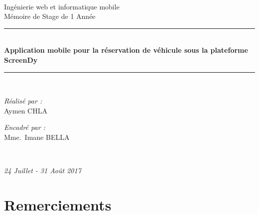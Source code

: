 \documentclass[12pt,a4paper]{report}
\makeatletter
\newcommand\mainmatter{%
	\cleardoublepage
	\pagenumbering{arabic}}
\makeatother
\begin{document}
\begin{titlepage}
\begin{center}
\begin{minipage}{0.4\textwidth}
		\end{minipage}\\[3cm]



		{\normalsize Ingénierie web et informatique mobile }\\[0.5cm]

		{\normalsize M\'emoire de Stage de  1 Ann\'ee}\\[0.5cm]

		\rule{\linewidth}{0.5mm} \\[0.4cm]
		{ \large \bfseries Application mobile pour la réservation de véhicule sous la plateforme ScreenDy \\[0.4cm] }
		\rule{\linewidth}{0.5mm} \\[3cm]

		\noindent
		\begin{minipage}{0.4\textwidth}
		  \begin{flushleft} \small
		    \emph{Réalisé par :}\\
		     Aymen \textsc{CHLA}\\
		  \end{flushleft}
		\end{minipage}%
		\begin{minipage}{0.4\textwidth}
		  \begin{flushright} \small
		    \emph{Encadré par :} \\
		    Mme.~Imane \textsc{BELLA}\\  
		  \end{flushright}
		\end{minipage}\\[4cm]

		\vfill

		{\large \slshape 24 Juillet - 31 Août 2017}

		\end{center}
	\end{titlepage}
	
	\restoregeometry
	\normalsize
	\clearpage
	\mainmatter


	\begingroup
	  \pagestyle{empty}
	  \null
	  \newpage
	\endgroup
	
	
	

	\chapter*{Remerciements}
	
\end{document}
